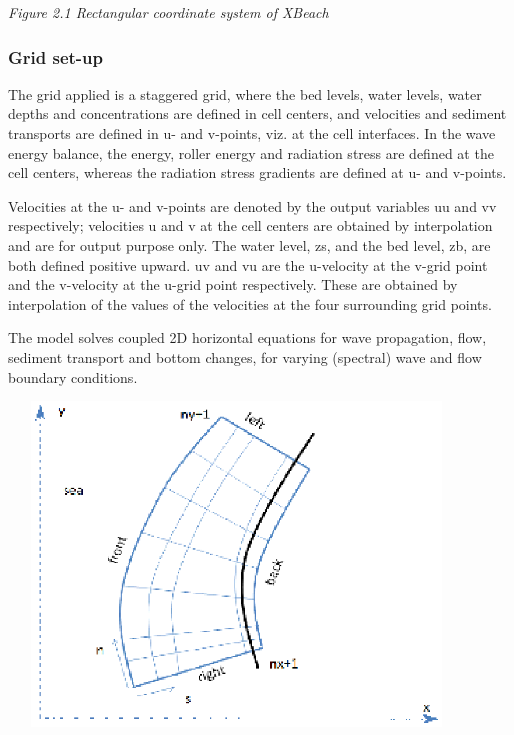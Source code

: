 \documentclass{article}
\begin{document}
\noindent \textit{Figure 2.1 Rectangular coordinate system of XBeach}


\subsubsection{ Grid set-up}

\noindent The grid applied is a staggered grid, where the bed levels, water levels, water depths and concentrations are defined in cell centers, and velocities and sediment transports are defined in u- and v-points, viz. at the cell interfaces. In the wave energy balance, the energy, roller energy and radiation stress are defined at the cell centers, whereas the radiation stress gradients are defined at u- and v-points.

\noindent 

\noindent Velocities at the u- and v-points are denoted by the output variables uu and vv respectively; velocities u and v at the cell centers are obtained by interpolation and are for output purpose only. The water level, zs, and the bed level, zb, are both defined positive upward. uv and vu are the u-velocity at the v-grid point and the v-velocity at the u-grid point respectively. These are obtained by interpolation of the values of the velocities at the four surrounding grid points. 

\noindent 

\noindent The model solves coupled 2D horizontal equations for wave propagation, flow, sediment transport and bottom changes, for varying (spectral) wave and flow boundary conditions.

\noindent 

\noindent 

\noindent \includegraphics*[width=4.76in, height=3.39in, keepaspectratio=false, trim=1.66in 2.97in 0.11in 1.81in]{image9}
\end{document}
